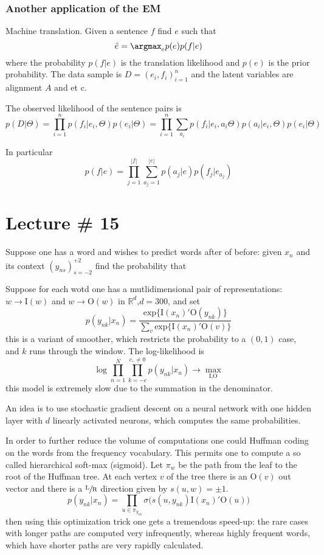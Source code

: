 \documentclass[a4paper]{article}
\newcommand{\Real}{\mathbb{R}}
\begin{document}

\subsubsection{Another application of the EM} %
\label{ssub:another_application_of_the_em}

Machine translation. Given a sentence $f$ find $e$ such that
\[ \hat{e} = \argmax_e p(e) p(f|e)\]
where the probability $p(f|e)$ is the translation likelihood and $p(e)$ is the 
prior probability. The data sample is $D = (e_i,f_i)_{i=1}^n$ and the latent variables
are alignment $A$ and et c.

The observed likelihood of the sentence pairs is
\[
p(D|\Theta)
= \prod_{i=1}^n p(f_i|e_i,\Theta) p(e_i|\Theta)
= \prod_{i=1}^n \sum_{a_i} p(f_i|e_i,a_i\Theta) p(a_i|e_i,\Theta) p(e_i|\Theta)
\]

In particular
\[
p(f|e) = \prod_{j=1}^{|f|} \sum_{a_j=1}^{|e|} p(a_j|e) p(f_j|e_{a_j})
\]


\section{Lecture \# 15} %
\label{sec:lecture_15}

Suppose one has a word and wishes to predict words after of before: given $x_n$
and its context $(y_{ns})_{s=-2}^{+2}$ find the probability that 


Suppose for each wotd one has a mutlidimensional pair of representations:
$w\to \text{I}(w)$ and $w\to \text{O}(w)$ in $\Real^d$,$d = 300$, and set
\[
p(y_{nk} | x_n)
= \frac{ \text{exp}\{ \text{I}(x_n)'\text{O}(y_{nk}) \} }{\sum_v \text{exp}\{ \text{I}(x_n)'\text{O}(v) \}}
\]
this is a variant of smoother, which restricts the probability to a $(0,1)$ case,
and $k$ runs through the window. The log-likelihood is
\[
\log \prod_{n=1}^N \prod_{k=-c}^{c,\neq 0} p(y_{nk} | x_n) \to \max_{\text{I},\text{O}}
\]
this model is extremely slow due to the summation in the denominator.

An idea is to use stochastic gradient descent on a neural network with one hidden
layer with $d$ linearly activated neurons, which computes the same probabilities.

In order to further reduce the volume of computations one could Huffman coding on
the words from the frequency vocabulary. This permits one to compute a so called
hierarchical soft-max (sigmoid). Let $\pi_w$ be the path from the leaf to the root
of the Huffman tree. At each vertex $v$ of the tree there is an $\text{O}(v)$ out
vector and there is a $\sfrac{\text{L}}{\text{R}}$ direction given by $s(u,w)=\pm1$.
\[
p(y_{nk} | x_n)
= \prod_{u\in\pi_{y_{nk}}} \sigma\bigl( s(u,y_{nk}) \text{I}(x_n)'\text{O}(u)\bigr)
\]
then using this optimization trick one gets a tremendous speed-up: the rare cases
with longer paths are computed very infrequently, whereas highly frequent words,
which have shorter paths are very rapidly calculated.




\end{document}
